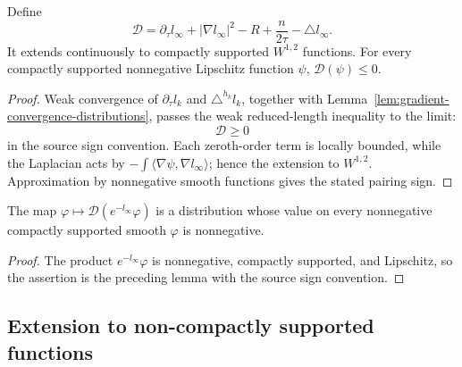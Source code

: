 \begin{lemma}\label{lem:distribution-d-nonpositive}

Define
\[
 \mathcal D=\partial_\tau l_\infty+|\nabla l_\infty|^2-R
 +\frac n{2\tau}-\triangle l_\infty.
\]
It extends continuously to compactly supported $W^{1,2}$ functions.
For every compactly supported nonnegative Lipschitz function $\psi$,
$\mathcal D(\psi)\leq0$.
\end{lemma}
\begin{proof}
\sketch
{}
Weak convergence of $\partial_\tau l_k$ and $\triangle^{h_k}l_k$,
together with Lemma~\ref{lem:gradient-convergence-distributions},
passes the weak reduced-length inequality to the limit:
\begin{equation}\label{1stlinftyeqn}
 \mathcal D\geq0
\end{equation}
in the source sign convention. Each zeroth-order term is locally
bounded, while the Laplacian acts by
$-\int\langle\nabla\psi,\nabla l_\infty\rangle$; hence the extension
to $W^{1,2}$. Approximation by nonnegative smooth functions gives the
stated pairing sign.
\end{proof}

\begin{corollary}\label{cor:weighted-distribution-nonnegative}
\label{etimesdis}

The map $\varphi\mapsto\mathcal D(e^{-l_\infty}\varphi)$ is a
distribution whose value on every nonnegative compactly supported
smooth $\varphi$ is nonnegative.
\end{corollary}
\begin{proof}
\sketch
{}
The product $e^{-l_\infty}\varphi$ is nonnegative, compactly
supported, and Lipschitz, so the assertion is the preceding lemma
with the source sign convention.
\end{proof}

\subsection{Extension to non-compactly supported functions}

